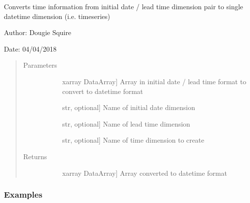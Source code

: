 \documentclass[letterpaper,10pt,english]{sphinxmanual}
\begin{document}
\begin{fulllineitems}
\label{\detokenize{utils_doc:utils.leadtime_to_datetime}}
Converts time information from initial date / lead time dimension pair to single datetime                 dimension (i.e. timeseries)

\begin{DUlineblock}{0em}
\item[] Author: Dougie Squire
\item[] Date: 04/04/2018
\end{DUlineblock}
\begin{quote}\begin{description}
\item[{Parameters}] \leavevmode\begin{description}
\item[{}] \leavevmode{[}xarray DataArray{]}
Array in initial date / lead time format to convert to datetime format

\item[{}] \leavevmode{[}str, optional{]}
Name of initial date dimension

\item[{}] \leavevmode{[}str, optional{]}
Name of lead time dimension

\item[{}] \leavevmode{[}str, optional{]}
Name of time dimension to create

\end{description}

\item[{Returns}] \leavevmode\begin{description}
\item[{}] \leavevmode{[}xarray DataArray{]}
Array converted to datetime format

\end{description}

\end{description}\end{quote}
\subsubsection*{Examples}


\end{fulllineitems}
\end{document}
